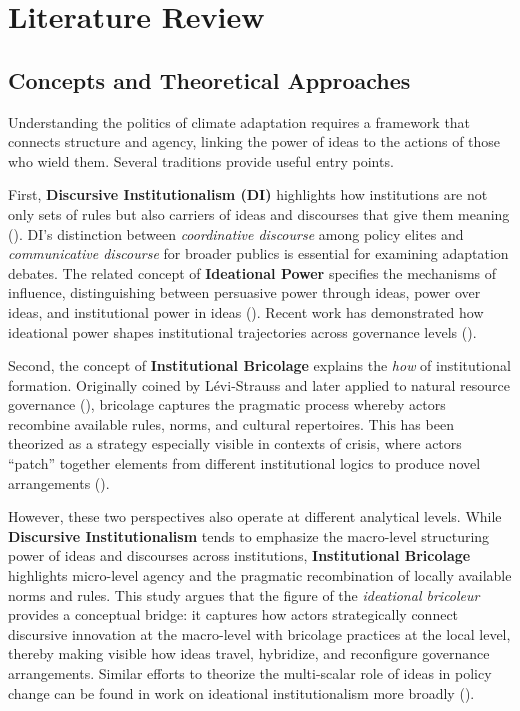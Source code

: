 \section*{Literature Review}

\subsection*{Concepts and Theoretical Approaches}

Understanding the politics of climate adaptation requires a framework that connects 
structure and agency, linking the power of ideas to the actions of those who wield them. 
Several traditions provide useful entry points.

First, \textbf{Discursive Institutionalism (DI)} highlights how institutions are not only 
sets of rules but also carriers of ideas and discourses that give them meaning 
(\cite{Schmidt2008}). DI’s distinction between \textit{coordinative discourse} among 
policy elites and \textit{communicative discourse} for broader publics is essential for 
examining adaptation debates. The related concept of \textbf{Ideational Power} specifies 
the mechanisms of influence, distinguishing between persuasive power through ideas, 
power over ideas, and institutional power in ideas (\cite{CarstensenSchmidt2016}). 
Recent work has demonstrated how ideational power shapes institutional trajectories 
across governance levels (\cite{Kleinschmit2024}).

Second, the concept of \textbf{Institutional Bricolage} explains the \textit{how} of 
institutional formation. Originally coined by L\'{e}vi-Strauss and later applied to 
natural resource governance (\cite{Cleaver2001}), bricolage captures the pragmatic 
process whereby actors recombine available rules, norms, and cultural repertoires. 
This has been theorized as a strategy especially visible in contexts of crisis, where 
actors “patch” together elements from different institutional logics to produce novel 
arrangements (\cite{Carstensen2017}).

However, these two perspectives also operate at different analytical levels. 
While \textbf{Discursive Institutionalism} tends to emphasize the macro-level 
structuring power of ideas and discourses across institutions, 
\textbf{Institutional Bricolage} highlights micro-level agency and the pragmatic 
recombination of locally available norms and rules. This study argues that the 
figure of the \textit{ideational bricoleur} provides a conceptual bridge: it 
captures how actors strategically connect discursive innovation at the macro-level 
with bricolage practices at the local level, thereby making visible how ideas travel, 
hybridize, and reconfigure governance arrangements. Similar efforts to theorize the 
multi-scalar role of ideas in policy change can be found in work on ideational 
institutionalism more broadly (\cite{BelandCox2011}).

